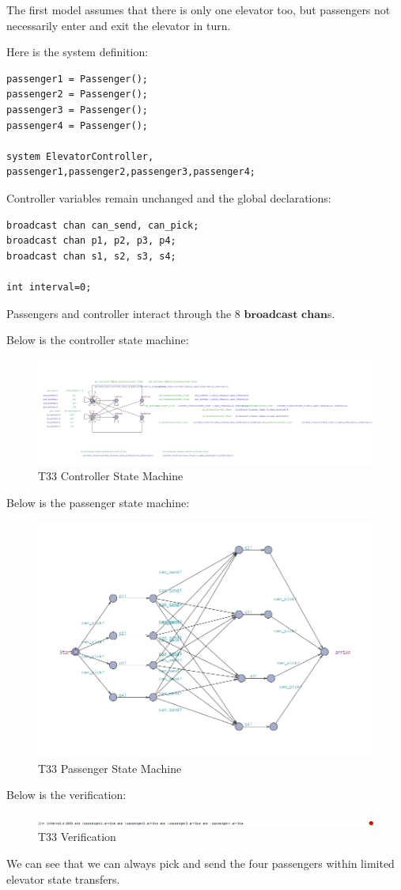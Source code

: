 \documentclass{article}
\begin{document}
The first model assumes that there is only one elevator too, but passengers not necessarily enter and exit the elevator in turn.

Here is the system definition:
\begin{lstlisting}
passenger1 = Passenger();
passenger2 = Passenger();
passenger3 = Passenger();
passenger4 = Passenger();

system ElevatorController, passenger1,passenger2,passenger3,passenger4;
\end{lstlisting}

Controller variables remain unchanged and the global declarations:
\begin{lstlisting}
broadcast chan can_send, can_pick;
broadcast chan p1, p2, p3, p4;
broadcast chan s1, s2, s3, s4;

int interval=0;
\end{lstlisting}

Passengers and controller interact through the 8 $\textbf{broadcast chan}$s.

Below is the controller state machine:

\begin{figure}[htbp]
    \centering
    \includegraphics[width=\textwidth]{img/uppaal_controller_2.png}
    \caption{T33 Controller State Machine}
\end{figure}

Below is the passenger state machine:

\begin{figure}[htbp]
    \centering
    \includegraphics[width=\textwidth]{img/uppaal_passenger_2.png}
    \caption{T33 Passenger State Machine}
\end{figure}

Below is the verification:

\begin{figure}[htbp]
    \centering
    \includegraphics[width=\textwidth]{img/uppaal_verification_2.png}
    \caption{T33 Verification}
\end{figure}

We can see that we can always pick and send the four passengers within limited elevator state transfers.
\end{document}
